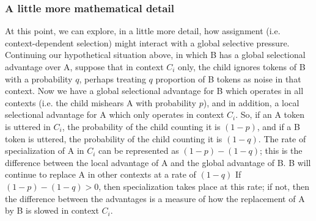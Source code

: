 \subsubsection{A little more mathematical detail}

At this point, we can explore, in a little more detail, how assignment (i.e. context-dependent selection) might interact with a global selective pressure.
Continuing our hypothetical situation above, in which B has a global selectional advantage over A, suppose that in context $C_i$ only, the child ignores tokens of B with a probability $q$, perhaps treating $q$ proportion of B tokens as noise in that context.
Now we have a global selectional advantage for B which operates in all contexts (i.e. the child mishears A with probability $p$), and in addition, a local selectional advantage for A which only operates in context $C_i$.
So, if an A token is uttered in $C_i$, the probability of the child counting it is $(1-p)$, and if a B token is uttered, the probability of the child counting it is $(1-q)$.
The rate of specialization of A in $C_i$ can be represented as $(1-p) - (1-q)$; this is the difference between the local advantage of A and the global advantage of B.
B will continue to replace A in other contexts at a rate of $(1-q)$
If $(1-p) - (1-q) > 0$, then specialization takes place at this rate; if not, then the difference between the advantages is a measure of how the replacement of A by B is slowed in context $C_i$.


